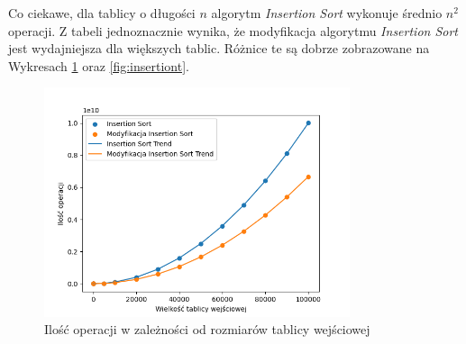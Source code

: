 \documentclass{article}
\begin{document}
\begin{table}[H]
    \centering
    \caption{Liczba operacji dla modyfikacji algorytmu \texttt{Insertion Sort} przy różnych rozmiarach tablicy}
    \label{tab:m_insertion_results}
\end{table}
Co ciekawe, dla tablicy o długości $n$ algorytm \textit{Insertion Sort} wykonuje średnio $n^2$ operacji. Z tabeli jednoznacznie wynika, że modyfikacja algorytmu \textit{Insertion Sort} jest wydajniejsza dla większych tablic. Różnice te są dobrze zobrazowane na Wykresach \ref{fig:insertion} oraz \ref{fig:insertiont}.
\begin{figure}[H]
    \centering
    \includegraphics[width=0.8\textwidth]{Figure_1.png}
    \caption{Ilość operacji w zależności od rozmiarów tablicy wejściowej}
    \label{fig:insertion}
\end{figure}
\end{document}
